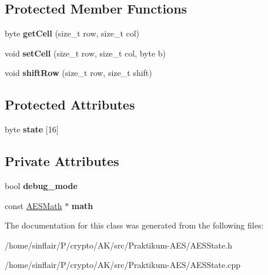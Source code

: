 \subsection*{Protected Member Functions}
\begin{DoxyCompactItemize}
\item 
\mbox{\label{classAESState_a40b1c825513553815de61e1f8e2b89be}} 
byte {\bfseries get\+Cell} (size\+\_\+t row, size\+\_\+t col)
\item 
\mbox{\label{classAESState_a8fc413a6fdf8211a8c81341c5fb98b2f}} 
void {\bfseries set\+Cell} (size\+\_\+t row, size\+\_\+t col, byte b)
\item 
\mbox{\label{classAESState_ad0b0ce9b90a20e90ebe714a96cb0513c}} 
void {\bfseries shift\+Row} (size\+\_\+t row, size\+\_\+t shift)
\end{DoxyCompactItemize}
\subsection*{Protected Attributes}
\begin{DoxyCompactItemize}
\item 
\mbox{\label{classAESState_a0ecd8ba384844aec6e8ad93b9ad1477b}} 
byte {\bfseries state} \mbox{[}16\mbox{]}
\end{DoxyCompactItemize}
\subsection*{Private Attributes}
\begin{DoxyCompactItemize}
\item 
\mbox{\label{classAESState_a7cd68a8ad4ea900df93a9adca4531a04}} 
bool {\bfseries debug\+\_\+mode}
\item 
\mbox{\label{classAESState_afd42377ff30e9d15bfef8a09e768380e}} 
const \hyperlink{classAESMath}{A\+E\+S\+Math} $\ast$ {\bfseries math}
\end{DoxyCompactItemize}


The documentation for this class was generated from the following files\+:\begin{DoxyCompactItemize}
\item 
/home/sinflair/\+P/crypto/\+A\+K/src/\+Praktikum-\/\+A\+E\+S/A\+E\+S\+State.\+h\item 
/home/sinflair/\+P/crypto/\+A\+K/src/\+Praktikum-\/\+A\+E\+S/A\+E\+S\+State.\+cpp\end{DoxyCompactItemize}
